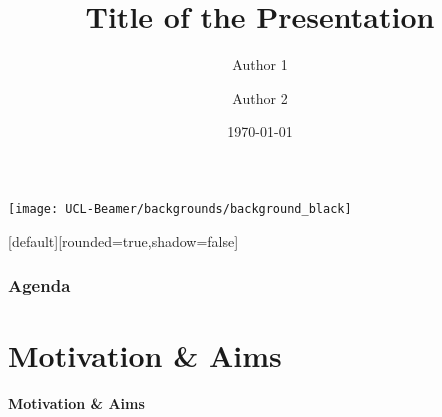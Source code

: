\documentclass[compress,12pt]{beamer} %
\title[Short Title]{Title of the Presentation}
\author[Auth. 1 \and Auth.2]{Author 1 \and Author 2}
\institute[UCL]{%
  Translational Imaging Group, CMIC\\%
  University College London
}
\date{\today}
\def\headline#1{\begin{frame}[c]\centering\color{headlinecolor}\LARGE\bfseries#1\end{frame}}
\begin{document}
\usebackgroundtemplate%
{%
    \texttt{[image: UCL-Beamer/backgrounds/background\_black]}%
}


\begin{frame}
    \vspace*{1cm}
    [default][rounded=true,shadow=false]

    \titlepage
\end{frame}


\begin{frame}[t]\frametitle{Agenda}
   \tableofcontents%
\end{frame}



\section{Motivation \& Aims}
\headline{Motivation \& Aims}

\end{document}
